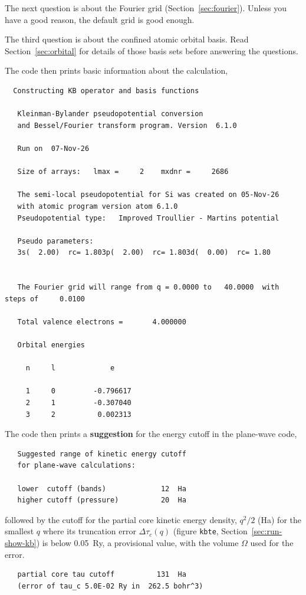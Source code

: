 \documentclass[11pt]{article}
\begin{document}
The next question is about the Fourier grid (Section~\ref{sec:fourier}).
Unless you have a good reason, the default grid is good enough.

The third question is about the confined atomic orbital basis.
Read Section~\ref{sec:orbital} for details of those basis sets
before answering the questions.

The code then prints basic information about the calculation,
\begin{verbatim}
  Constructing KB operator and basis functions

   Kleinman-Bylander pseudopotential conversion
   and Bessel/Fourier transform program. Version  6.1.0

   Run on  07-Nov-26

   Size of arrays:   lmax =     2    mxdnr =     2686

   The semi-local pseudopotential for Si was created on 05-Nov-26
   with atomic program version atom 6.1.0
   Pseudopotential type:   Improved Troullier - Martins potential

   Pseudo parameters:
   3s(  2.00)  rc= 1.803p(  2.00)  rc= 1.803d(  0.00)  rc= 1.80


   The Fourier grid will range from q = 0.0000 to   40.0000  with steps of     0.0100

   Total valence electrons =       4.000000

   Orbital energies

     n     l             e

     1     0         -0.796617
     2     1         -0.307040
     3     2          0.002313
\end{verbatim}
The code then prints a \textbf{suggestion} for the energy cutoff
in the plane-wave code,
\begin{verbatim}
   Suggested range of kinetic energy cutoff
   for plane-wave calculations:

   lower  cutoff (bands)             12  Ha
   higher cutoff (pressure)          20  Ha
\end{verbatim}
\label{sec:kb-cutoffs}
followed by the cutoff for the partial core kinetic energy density, $q^2/2$ (Ha) for the
smallest $q$ where its truncation error $\Delta \tau_c(q)$ (figure \texttt{kbte}, Section~\ref{sec:run-show-kb})
is below 0.05~Ry, a provisional value, with the volume $\Omega$ used for the error.
\begin{verbatim}
   partial core tau cutoff          131  Ha
   (error of tau_c 5.0E-02 Ry in  262.5 bohr^3)
\end{verbatim}
\end{document}
